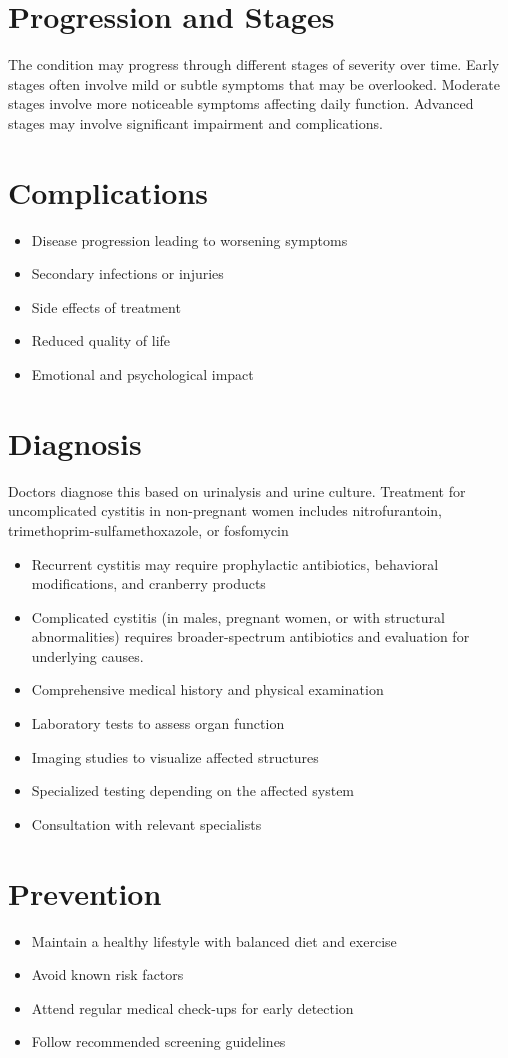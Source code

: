 \section{Progression and Stages}
The condition may progress through different stages of severity over time. Early stages often involve mild or subtle symptoms that may be overlooked. Moderate stages involve more noticeable symptoms affecting daily function. Advanced stages may involve significant impairment and complications.
\section{Complications}
\begin{itemize}[noitemsep]
  \item Disease progression leading to worsening symptoms
  \item Secondary infections or injuries
  \item Side effects of treatment
  \item Reduced quality of life
  \item Emotional and psychological impact
\end{itemize}
\section{Diagnosis}
Doctors diagnose this based on urinalysis and urine culture. Treatment for uncomplicated cystitis in non-pregnant women includes nitrofurantoin, trimethoprim-sulfamethoxazole, or fosfomycin

\begin{itemize}[noitemsep]
  \item Recurrent cystitis may require prophylactic antibiotics, behavioral modifications, and cranberry products
  \item Complicated cystitis (in males, pregnant women, or with structural abnormalities) requires broader-spectrum antibiotics and evaluation for underlying causes.
  \item Comprehensive medical history and physical examination
  \item Laboratory tests to assess organ function
  \item Imaging studies to visualize affected structures
  \item Specialized testing depending on the affected system
  \item Consultation with relevant specialists
\end{itemize}
\section{Prevention}
\begin{itemize}[noitemsep]
  \item Maintain a healthy lifestyle with balanced diet and exercise
  \item Avoid known risk factors
  \item Attend regular medical check-ups for early detection
  \item Follow recommended screening guidelines
\end{itemize}
